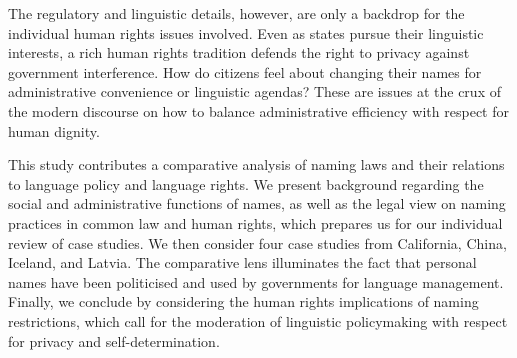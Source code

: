 The regulatory and linguistic details, however, are only a backdrop for the
individual human rights issues involved. Even as states pursue their linguistic
interests, a rich human rights tradition defends the right to privacy against
government interference. How do citizens feel about changing their names for
administrative convenience or linguistic agendas? These are issues at the crux
of the modern discourse on how to balance administrative efficiency with
respect for human dignity.

This study contributes a comparative analysis of naming laws and their
relations to language policy and language rights. We present background
regarding the social and administrative functions of names, as well as the
legal view on naming practices in common law and human rights, which prepares
us for our individual review of case studies.  We then consider four case
studies from California, China, Iceland, and Latvia. The comparative lens
illuminates the fact that personal names have been politicised and used by
governments for language management. Finally, we conclude by considering the
human rights implications of naming restrictions, which call for the moderation
of linguistic policymaking with respect for privacy and self-determination.
